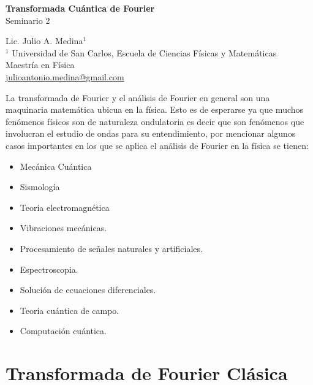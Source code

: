 \documentclass[a4paper]{article}
\begin{document}

\Large
 \begin{center}
\textbf{Transformada Cuántica de Fourier}\\
Seminario 2  

\hspace{10pt}

\large
Lic. Julio A. Medina$^1$ \\

\hspace{10pt}
\small  
$^1$ Universidad de San Carlos, Escuela de Ciencias Físicas y Matemáticas\\
Maestría en Física\\
\href{mailto:julioantonio.medina@gmail.com}{julioantonio.medina@gmail.com}\\

\end{center}

\hspace{10pt}

\normalsize
La transformada de Fourier y el análisis de Fourier en general son una maquinaria matemática ubicua en la física. Esto es de esperarse ya que muchos fenómenos físicos son de naturaleza ondulatoria es decir que son fenómenos que involucran el estudio de ondas para su entendimiento, por mencionar algunos casos importantes en los que se aplica el análisis de Fourier en la física se tienen: \\

\begin{itemize}
\item Mecánica Cuántica
\item Sismología
\item Teoría electromagnética
\item Vibraciones mecánicas.
\item Procesamiento de señales naturales y artificiales.
\item Espectroscopia. 
\item Solución de ecuaciones diferenciales.
\item Teoría cuántica de campo.
\item Computación cuántica.

\end{itemize} 

\section{Transformada de Fourier Clásica}
\end{document}
